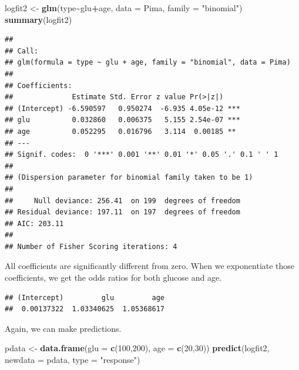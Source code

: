 \documentclass[
]{book}
\newenvironment{Shaded}{\begin{snugshade}}{\end{snugshade}}
\newcommand{\AttributeTok}[1]{\textcolor[rgb]{0.13,0.29,0.53}{#1}}
\newcommand{\DecValTok}[1]{\textcolor[rgb]{0.00,0.00,0.81}{#1}}
\newcommand{\FunctionTok}[1]{\textcolor[rgb]{0.13,0.29,0.53}{\textbf{#1}}}
\newcommand{\NormalTok}[1]{#1}
\newcommand{\OtherTok}[1]{\textcolor[rgb]{0.56,0.35,0.01}{#1}}
\newcommand{\SpecialCharTok}[1]{\textcolor[rgb]{0.81,0.36,0.00}{\textbf{#1}}}
\newcommand{\StringTok}[1]{\textcolor[rgb]{0.31,0.60,0.02}{#1}}
\theoremstyle{definition}
\theoremstyle{definition}
\theoremstyle{definition}
\theoremstyle{definition}
\theoremstyle{remark}
\begin{document}
\begin{Shaded}
\begin{Highlighting}[]
\NormalTok{logfit2 }\OtherTok{\textless{}{-}} \FunctionTok{glm}\NormalTok{(type}\SpecialCharTok{\textasciitilde{}}\NormalTok{glu}\SpecialCharTok{+}\NormalTok{age, }\AttributeTok{data =}\NormalTok{ Pima,  }
            \AttributeTok{family =} \StringTok{"binomial"}\NormalTok{)}
\FunctionTok{summary}\NormalTok{(logfit2)}
\end{Highlighting}
\end{Shaded}

\begin{verbatim}
## 
## Call:
## glm(formula = type ~ glu + age, family = "binomial", data = Pima)
## 
## Coefficients:
##              Estimate Std. Error z value Pr(>|z|)    
## (Intercept) -6.590597   0.950274  -6.935 4.05e-12 ***
## glu          0.032860   0.006375   5.155 2.54e-07 ***
## age          0.052295   0.016796   3.114  0.00185 ** 
## ---
## Signif. codes:  0 '***' 0.001 '**' 0.01 '*' 0.05 '.' 0.1 ' ' 1
## 
## (Dispersion parameter for binomial family taken to be 1)
## 
##     Null deviance: 256.41  on 199  degrees of freedom
## Residual deviance: 197.11  on 197  degrees of freedom
## AIC: 203.11
## 
## Number of Fisher Scoring iterations: 4
\end{verbatim}

All coefficients are significantly different from zero. When we exponentiate those coefficients, we get the odds ratios for both glucose and age.

\begin{Shaded}
\end{Shaded}

\begin{verbatim}
## (Intercept)         glu         age 
##  0.00137322  1.03340625  1.05368617
\end{verbatim}

Again, we can make predictions.

\begin{Shaded}
\begin{Highlighting}[]
\NormalTok{pdata }\OtherTok{\textless{}{-}} \FunctionTok{data.frame}\NormalTok{(}\AttributeTok{glu =} \FunctionTok{c}\NormalTok{(}\DecValTok{100}\NormalTok{,}\DecValTok{200}\NormalTok{), }\AttributeTok{age =} \FunctionTok{c}\NormalTok{(}\DecValTok{20}\NormalTok{,}\DecValTok{30}\NormalTok{))}
\FunctionTok{predict}\NormalTok{(logfit2, }\AttributeTok{newdata =}\NormalTok{ pdata,  }\AttributeTok{type =} \StringTok{"response"}\NormalTok{)}
\end{Highlighting}
\end{Shaded}
\end{document}

